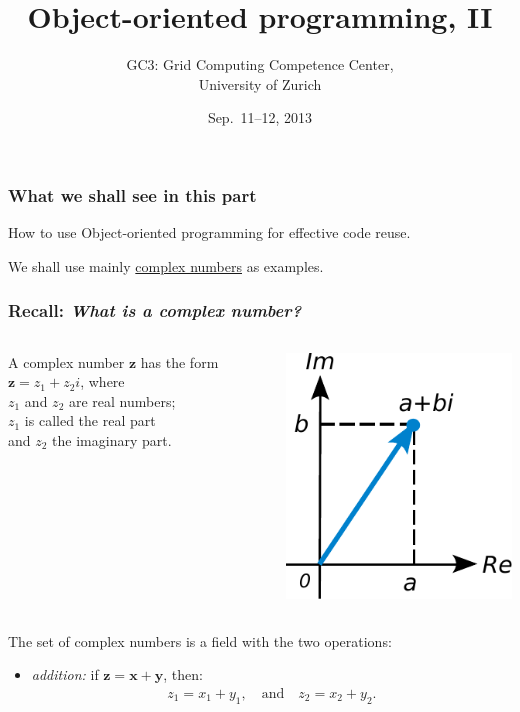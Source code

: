 \documentclass[english,serif,mathserif,xcolor=pdftex,dvipsnames,table]{beamer}
\title[OOP 2]{%
  Object-oriented programming, II
}
\author[GC3]{%
  GC3: Grid Computing Competence Center, \\
  University of Zurich
}
\date{Sep.~11--12, 2013}
\begin{document}
\maketitle


\begin{frame}
  \frametitle{What we shall see in this part}

  How to use Object-oriented programming for effective code reuse.

  \+
  We shall use mainly
  \href{http://mathworld.wolfram.com/ComplexNumber.html}{complex
    numbers} as examples.
\end{frame}


\begin{frame}
  \frametitle{Recall: \emph{What is a complex number?}}

  \begin{columns}
    \begin{column}{0.6\linewidth}
      \raggedleft
      A complex number $\mathbf{z}$ has the form $\mathbf{z} = z_1 + z_2i$, where \\
      $z_1$ and $z_2$ are real numbers; \\
      $z_1$ is called the real part \\
      and $z_2$ the imaginary part.
    \end{column}
    \begin{column}{0.4\linewidth}
      \centering
      \includegraphics[height=5\baselineskip]{fig/ComplexNumber}
    \end{column}
  \end{columns}

  \+
  The set of complex numbers is a field with the two operations:
  \begin{itemize}
  \item
    \emph{addition:} if $\mathbf{z} = \mathbf{x} + \mathbf{y}$,
    then:
    \begin{gather*}
      z_1 = x_1 + y_1, \quad \text{and} \quad z_2 = x_2 + y_2.
    \end{gather*}


\end{itemize}
\end{frame}
\end{document}
